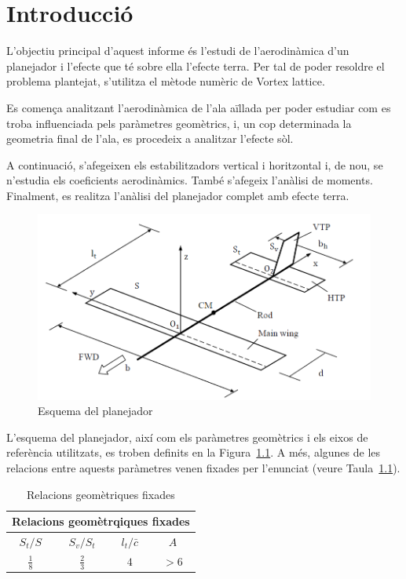 \chapter{Introducció}

L'objectiu principal d'aquest informe és l'estudi de l'aerodinàmica d'un planejador i l'efecte que té sobre ella l'efecte terra. Per tal de poder resoldre el problema plantejat, s'utilitza el mètode numèric de Vortex lattice.

Es comença analitzant l'aerodinàmica de l'ala aïllada per poder estudiar com es troba influenciada pels paràmetres geomètrics, i, un cop determinada la geometria final de l'ala, es procedeix a analitzar l'efecte sòl.

A continuació, s'afegeixen els estabilitzadors vertical i horitzontal i, de nou, se n'estudia els coeficients aerodinàmics. També s'afegeix l'anàlisi de moments. Finalment, es realitza l'anàlisi del planejador complet amb efecte terra.

\begin{figure}[H]
	\centering
	\includegraphics[scale=0.5]{plots/enunciat.png}
	\caption{Esquema del planejador \cite{LizandraDalmases2017a}}
	\label{enunciat}
\end{figure}

L'esquema del planejador, així com els paràmetres geomètrics i els eixos de referència utilitzats, es troben definits en la Figura~\ref{enunciat}. A més, algunes de les relacions entre aquests paràmetres venen fixades per l'enunciat (veure Taula~\ref{tab:Dades}).

\begin{table} [H]
	\centering
	\begin{tabular}{| c | c | c | c |}	
		\hline
		\multicolumn{4}{|c|}{\bfseries Relacions geomètrqiques fixades} \\
		\hline\hline
	\textbf{$S_{t}/S$} & \textbf{$S_{v}/S_{t}$} & \textbf{$l_{t}/\bar{c}$} & \textbf{$A$}\\ \hline 
		$\frac{1}{8}$ & $\frac{2}{3}$ & $4$ & $>6$\\
		\hline	
	\end{tabular}
\caption{Relacions geomètriques fixades} \label{tab:Dades}
\end{table}


